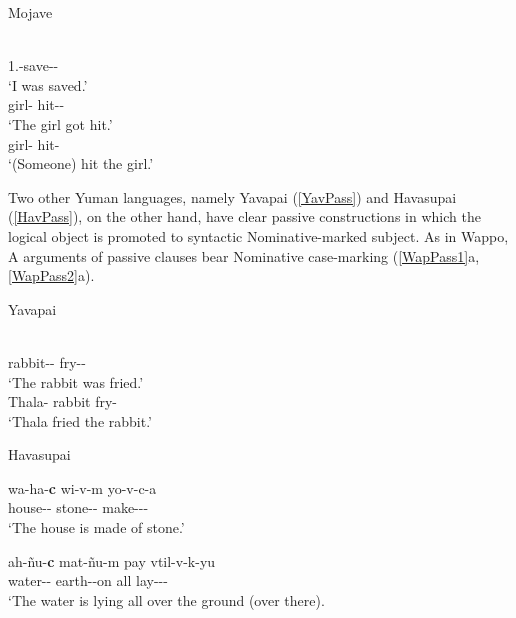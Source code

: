 \begin{exe}\ex\label{MojPass} {Mojave} \citep[241, 220]{Munro:1976}\nopagebreak[4]
\begin{xlist}
\ex\gll {}\\
1.\obj{}-save-\pass{}-\tns{}\\
`I was saved.' 
\ex\gll {} \\
girl-\dem{} hit-\pass{}-\tns{}\\
`The girl got hit.' 
\ex\gll {} \\
girl-\dem{} hit-\tns{}\\
`(Someone) hit the girl.'
\end{xlist}
\end{exe}


Two other Yuman languages, namely Yavapai (\ref{YavPass}) and Havasupai (\ref{HavPass}), %
on the other hand, have clear passive constructions in which the logical object is promoted to syntactic Nominative-marked  subject.
As in Wappo, A arguments of passive clauses bear Nominative  case-marking (\ref{WapPass1}a, \ref{WapPass2}a).

\begin{exe}\ex\label{YavPass} {Yavapai} \citep[127]{Kendall:1976}\nopagebreak[4]
\begin{xlist}
\ex\gll{} \\
rabbit-\dem{}-\nom{}  fry-\pass{}-\compl{}\\
`The rabbit was fried.' 
\ex\gll {}  \\
Thala-\nom{} rabbit fry-\compl{}\\
\glt `Thala fried the rabbit.'
\end{xlist}
\end{exe}

\pagebreak
\begin{exe}\ex\label{HavPass} {Havasupai} \citep[Yuman; Arizona; ][60, 61]{Kozlowski:1972}\nopagebreak[4]
\begin{xlist}
\ex\gll wa-ha-\textbf{c} wi-v-m yo-v-c-a\\
house-\dem{}-\nom{} stone-\dem{}-\prtv{} make-\pass{}-\pl{}-\modal{}\\
`The house is made of stone.' 

\ex\gll ah-\~nu-\textbf{c} mat-\~nu-m pay vtil-v-k-yu\\
water-\dem{}-\nom{} earth-\dem{}-on all lay-\pass{}-\ind{}-\aux{}\\
`The water is lying all over the ground (over there). %
\end{xlist}
\end{exe}

